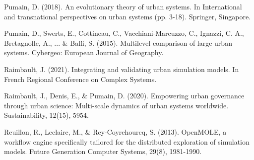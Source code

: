 \documentclass[12pt]{article}
\begin{document}
\vspace{1cm}

\noindent Pumain, D. (2018). An evolutionary theory of urban systems. In International and transnational perspectives on urban systems (pp. 3-18). Springer, Singapore.

\noindent Pumain, D., Swerts, E., Cottineau, C., Vacchiani-Marcuzzo, C., Ignazzi, C. A., Bretagnolle, A., ... \& Baffi, S. (2015). Multilevel comparison of large urban systems. Cybergeo: European Journal of Geography.

\noindent Raimbault, J. (2021). Integrating and validating urban simulation models. In French Regional Conference on Complex Systems.

\noindent Raimbault, J., Denis, E., \& Pumain, D. (2020). Empowering urban governance through urban science: Multi-scale dynamics of urban systems worldwide. Sustainability, 12(15), 5954.

\noindent Reuillon, R., Leclaire, M., & Rey-Coyrehourcq, S. (2013). OpenMOLE, a workflow engine specifically tailored for the distributed exploration of simulation models. Future Generation Computer Systems, 29(8), 1981-1990.
\end{document}
